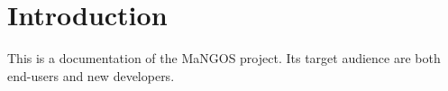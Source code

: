 \chapter{Introduction}

This is a documentation of the MaNGOS project. Its target audience are both end-users and new developers.

